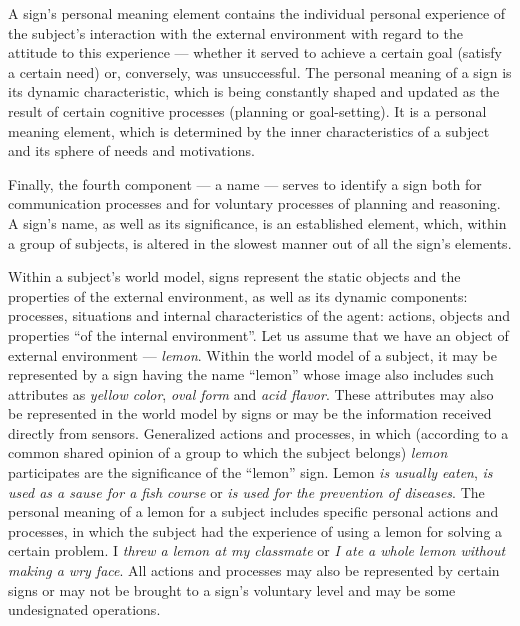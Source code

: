 \documentclass[review]{elsarticle}
\begin{document}
A sign's personal meaning element contains the individual personal experience of the subject's interaction with the external environment with regard to the attitude to this experience --- whether it served to achieve a certain goal (satisfy a certain need) or, conversely, was unsuccessful. The personal meaning of a sign is its dynamic characteristic, which is being constantly shaped and updated as the result of certain cognitive processes (planning or goal-setting). It is a personal meaning element, which is determined by the inner characteristics of a subject and its sphere of needs and motivations. 

Finally, the fourth component --- a name --- serves to identify a sign both for communication processes and for voluntary processes of planning and reasoning. A sign's name, as well as its significance, is an established element, which, within a group of subjects, is altered in the slowest manner out of all the sign’s elements.

Within a subject's world model, signs represent the static objects and the properties of the external environment, as well as its dynamic components: processes, situations and internal characteristics of the agent: actions, objects and properties ``of the internal environment''. Let us assume that we have an object of external environment --- \textit{lemon}. Within the world model of a subject, it may be represented by a sign having the name ``lemon'' whose image also includes such attributes as \textit{yellow color}, \textit{oval form} and \textit{acid flavor}. These attributes may also be represented in the world model by signs or may be the information received directly from sensors. Generalized actions and processes, in which (according to a common shared opinion of a group to which the subject belongs) \textit{lemon} participates are the significance of the ``lemon'' sign. Lemon \textit{is usually eaten}, \textit{is used as a sause for a fish course} or \textit{is used for the prevention of diseases}. The personal meaning of a lemon for a subject includes specific personal actions and processes, in which the subject had the experience of using a lemon for solving a certain problem. I \textit{threw a lemon at my classmate} or \textit{I ate a whole lemon without making a wry face}. All actions and processes may also be represented by certain signs or may not be brought to a sign's voluntary level and may be some undesignated operations.
\end{document}
